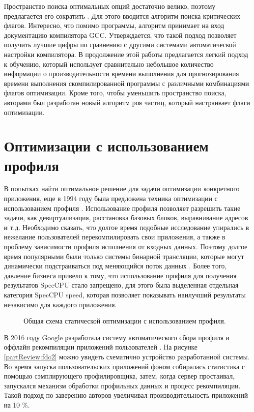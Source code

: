 Пространство поиска оптимальных опций достаточно велико, поэтому предлагается его сократить \cite{zhu2023compiler}. Для этого вводится алгоритм поиска критических флагов. Интересно, что помимо программы, алгоритм принимает на вход документацию компилятора GCC. Утверждается, что такой подход позволяет получить лучшие цифры по сравнению с другими системами автоматической настройки компилятора.  В продолжение этой работы \cite{zhu2024compiler} предлагается легкий подход к обучению, который использует сравнительно небольшое количество информации о производительности времени выполнения для прогнозирования времени выполнения скомпилированной программы с различными комбинациями флагов оптимизации. Кроме того, чтобы уменьшить пространство поиска, авторами был разработан новый алгоритм роя частиц, который настраивает флаги оптимизации.


\section{Оптимизации с использованием профиля} \label{pr:pgo}
В попытках  найти оптимальное решение для задачи оптимизации конкретного приложения, еще в 1994 году была предложена техника оптимизации с использованием профиля \cite{liew1994feedback}. Использование профиля позволяет разрешить такие задачи, как девиртуализация, расстановка базовых блоков, выравнивание адресов и т.д. Необходимо сказать, что долгое время подобные исследование упирались в нежелание пользователей перекомпилировать свои приложения, а также в проблему зависимости профиля исполнения от входных данных. Поэтому долгое  время популярными были только системы бинарной трансляции, которые могут динамически подстраиваться под меняющийся поток данных \cite{dange2014systematic}. Более того, давление бизнеса привело к тому, что использование профиля для получения результатов SpecCPU стало запрещено, для этого была выделенная отдельная категория SpecCPU speed, которая позволяет показывать наилучший результаты независимо для каждого приложения.
 \begin{figure}[htbp]
	\centering
	
	\caption{Общая схема статической оптимизации с использованием профиля.}
	\label{partReview:fdo1}
\end{figure}

В 2016 году Google разработала систему автоматического сбора профиля и оффлайн рекомпиляции приложений пользователей \cite{chen2016autofdo}. На рисунке \ref{partReview:fdo2} можно увидеть схематично устройство разработанной системы. Во время запуска пользовательских приложений фоном собиралась статистика с помощью сэмплирующего профилировщика, затем, когда сервер простаивал, запускался механизм обработки профильных данных и процесс рекомпиляции. Такой подход по заверению авторов увеличивал производительность приложений на 10 \%.  

